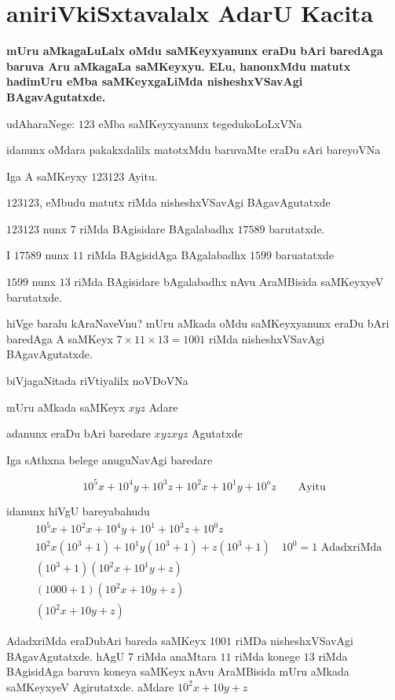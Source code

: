 \chapter{aniriVkiSxtavalalx AdarU Kacita}

{\bf mUru aMkagaLuLalx oMdu saMKeyxyanunx eraDu bAri baredAga baruva Aru aMkagaLa saMKeyxyu. ELu, hanonxMdu matutx hadimUru eMba saMKeyxgaLiMda nisheshxVSavAgi BAgavAgutatxde.}

udAharaNege: $123$ eMba saMKeyxyanunx tegedukoLoLxVNa

idanunx oMdara pakakxdalilx matotxMdu baruvaMte eraDu sAri bareyoVNa

Iga A saMKeyxy $123123$ Ayitu.

$123123$, eMbudu {} matutx {} riMda nisheshxVSavAgi BAgavAgutatxde

$123123$ nunx $7$ riMda BAgisidare BAgalabadhx $17589$ barutatxde.

I $17589$ nunx $11$ riMda BAgisidAga BAgalabadhx $1599$ baruatatxde

$1599$ nunx $13$ riMda BAgisidare bAgalabadhx nAvu AraMBisida saMKeyxyeV barutatxde.

hiVge baralu kAraNaveVnu? mUru aMkada oMdu saMKeyxyanunx eraDu bAri baredAga A saMKeyx $7\times 11 \times 13 = 1001$ riMda nisheshxVSavAgi BAgavAgutatxde.

biVjagaNitada riVtiyalilx noVDoVNa

mUru aMkada saMKeyx $xyz$ Adare

adanunx eraDu bAri baredare $xyzxyz$ Agutatxde

Iga sAthxna belege anuguNavAgi baredare

$$
10^5x+10^4y+10^3z+10^2x+10^1y+10^{o}z \qquad\text{Ayitu}
$$

idanunx hiVgU bareyabahudu
\begin{align*}
&10^{5}x+10^{2}x+10^{4}y+10^1+10^{3}z+10^{0}z\\
&10^{2}x\left(10^3+1\right) + 10^{1}y\left(10^3+1\right) + z\left(10^3 + 1\right) \quad\text{$10^0 = 1$ AdadxriMda}\\
&\left(10^3+1\right)\left(10^{2}x + 10^1{y} + z\right)\\
&(1000+1)\left(10^{2}x+10y+z\right)\\
&\left(10^{2}x +10y +z\right)
\end{align*}

AdadxriMda eraDubAri bareda saMKeyx $1001$ riMDa nisheshxVSavAgi BAgavAgutatxde. hAgU $7$ riMda anaMtara $11$ riMda konege $13$ riMda BAgisidAga baruva koneya saMKeyx nAvu AraMBisida mUru aMkada saMKeyxyeV Agirutatxde. aMdare $10^{2}x+10y+z$

